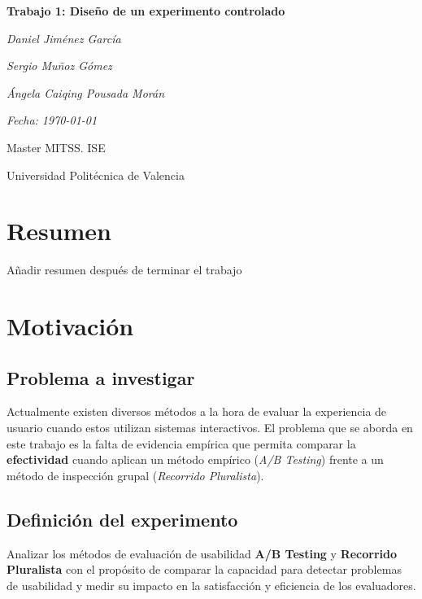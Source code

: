 \documentclass[a4paper,12pt]{report}
\begin{document}
\begin{titlepage}
    \centering
    \vspace*{3cm}
    {\Huge\bfseries Trabajo 1: Diseño de un experimento controlado \par}
    \vspace{2cm}
    {\Large\itshape Daniel Jiménez García \par}
    {\Large\itshape Sergio Muñoz Gómez \par}
    {\Large\itshape Ángela Caiqing Pousada Morán \par}
    \vspace{1cm}
    {\Large\itshape Fecha: \today \par}
    \vfill
    {\large Master MITSS. ISE \par}
    {\large Universidad Politécnica de Valencia\par}
\end{titlepage}


\chapter*{Resumen}

Añadir resumen después de terminar el trabajo


\chapter{Motivación}

\section{Problema a investigar}
Actualmente existen diversos métodos a la hora de evaluar la experiencia de usuario cuando estos utilizan sistemas interactivos. El problema que se aborda en este trabajo es la falta de evidencia empírica que permita comparar la \textbf{efectividad} cuando aplican un método empírico (\textit{A/B Testing}) frente a un método de inspección grupal (\textit{Recorrido Pluralista}).

\section{Definición del experimento}
Analizar los métodos de evaluación de usabilidad \textbf{A/B Testing} y \textbf{Recorrido Pluralista} con el propósito de comparar la capacidad para detectar problemas de usabilidad y medir su impacto en la satisfacción y eficiencia de los evaluadores.
\end{document}
